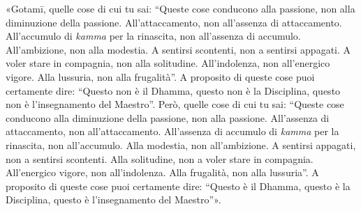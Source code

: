 «Gotamī, quelle cose di cui tu sai: “Queste cose conducono alla
passione, non alla diminuzione della passione. All’attaccamento, non
all’assenza di attaccamento. All’accumulo di \emph{kamma} per la rinascita,
non all’assenza di accumulo. All’ambizione, non alla modestia. A
sentirsi scontenti, non a sentirsi appagati. A voler stare in compagnia,
non alla solitudine. All’indolenza, non all’energico vigore. Alla
lussuria, non alla frugalità”. A proposito di queste cose puoi
certamente dire: “Questo non è il Dhamma, questo non è la Disciplina,
questo non è l’insegnamento del Maestro”. Però, quelle cose di cui tu
sai: “Queste cose conducono alla diminuzione della passione, non alla
passione. All’assenza di attaccamento, non all’attaccamento. All’assenza
di accumulo di \emph{kamma} per la rinascita, non all’accumulo. Alla
modestia, non all’ambizione. A sentirsi appagati, non a sentirsi
scontenti. Alla solitudine, non a voler stare in compagnia. All’energico
vigore, non all’indolenza. Alla frugalità, non alla lussuria”. A
proposito di queste cose puoi certamente dire: “Questo è il Dhamma,
questo è la Disciplina, questo è l’insegnamento del Maestro”».





